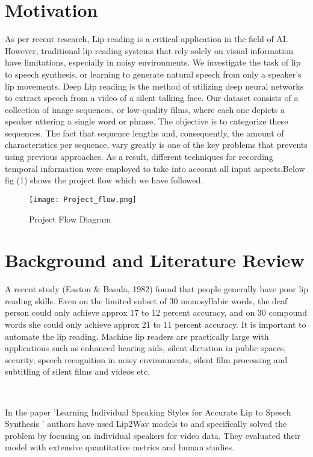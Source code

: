 \documentclass[conference]{IEEEtran}
\begin{document}
\section{Motivation}
As per recent research, Lip-reading is a critical application in the field of AI. However, traditional lip-reading systems that rely solely on visual information have limitations, especially in noisy environments. We investigate the task of lip to speech synthesis, or learning to generate natural speech from only a speaker's lip movements. Deep Lip reading is the method of utilizing deep neural networks to extract speech from a video of a silent talking face.
Our dataset consists of a collection of image sequences, or low-quality films, where each one depicts a speaker uttering a single word or phrase. The objective is to categorize these sequences.
The fact that sequence lengths and, consequently, the amount of characteristics per sequence, vary greatly is one of the key problems that prevents using previous approaches. As a result, different techniques for recording temporal information were employed to take into account all input aspects.Below fig (1) shows the project flow which we have followed.

\begin{figure}[htbp]
\centerline{\texttt{[image: Project\_flow.png]}}
\caption{Project Flow Diagram}
\label{fig}
\end{figure}
 
\section{Background and Literature Review}
A recent study (Easton & Basala, 1982) found that people generally have poor lip reading skills. Even on the limited subset of 30 monosyllabic words, the deaf person could only achieve approx 17 to 12 percent accuracy, and on 30 compound words she could only achieve approx 21 to 11 percent accuracy. It is important to automate the lip reading. Machine lip readers are practically large with applications such as enhanced hearing aids, silent dictation in public spaces, security, speech recognition in noisy environments, silent film processing and subtitling of silent films and videos etc.

\\\par\noindent\hspace{.5cm}In the paper 'Learning Individual Speaking Styles for Accurate Lip to Speech Synthesis ' authors have used Lip2Wav models to and  specifically solved the problem by focusing on individual speakers  for video data. They evaluated their  model with extensive quantitative metrics and human studies.
\end{document}

